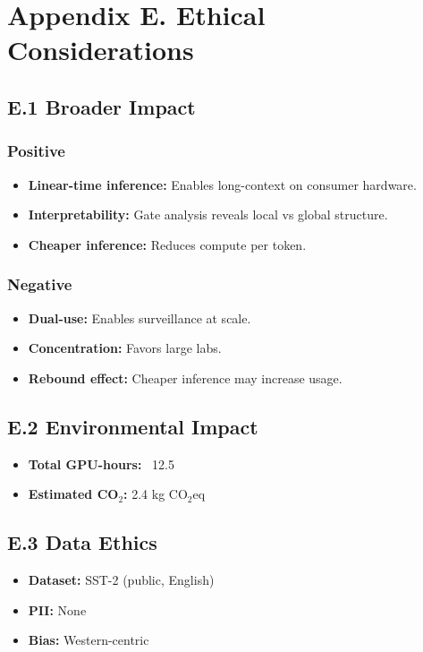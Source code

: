 
\section{Appendix E. Ethical Considerations}

\subsection{E.1 Broader Impact}

\subsubsection{Positive}
\begin{itemize}
\item \textbf{Linear-time inference:} Enables long-context on consumer hardware.
\item \textbf{Interpretability:} Gate analysis reveals local vs global structure.
\item \textbf{Cheaper inference:} Reduces compute per token.

\end{itemize}
\subsubsection{Negative}
\begin{itemize}
\item \textbf{Dual-use:} Enables surveillance at scale.
\item \textbf{Concentration:} Favors large labs.
\item \textbf{Rebound effect:} Cheaper inference may increase usage.

\end{itemize}
\subsection{E.2 Environmental Impact}

\begin{itemize}
\item \textbf{Total GPU-hours:} ~12.5
\item \textbf{Estimated CO$_2$:} 2.4 kg CO$_2$eq

\end{itemize}
\subsection{E.3 Data Ethics}

\begin{itemize}
\item \textbf{Dataset:} SST-2 (public, English)
\item \textbf{PII:} None
\item \textbf{Bias:} Western-centric

\end{itemize}
